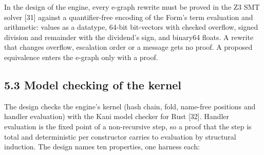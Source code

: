 \documentclass[10pt,letterpaper]{article}
\begin{document}
In the design of the engine, every e-graph rewrite must be proved in the
Z3 SMT solver {[}31{]} against a quantifier-free encoding of the Form's
term evaluation and arithmetic: values as a datatype, 64-bit bit-vectors
with checked overflow, signed division and remainder with the dividend's
sign, and binary64 floats. A rewrite that changes overflow, escalation
order or a message gets no proof. A proposed equivalence enters the
e-graph only with a proof.

\subsection{5.3 Model checking of the
kernel}\label{model-checking-of-the-kernel}

The design checks the engine's kernel (hash chain, fold, name-free
positions and handler evaluation) with the Kani model checker for Rust
{[}32{]}. Handler evaluation is the fixed point of a non-recursive step,
so a proof that the step is total and deterministic per constructor
carries to evaluation by structural induction. The design names ten
properties, one harness each:
\end{document}

